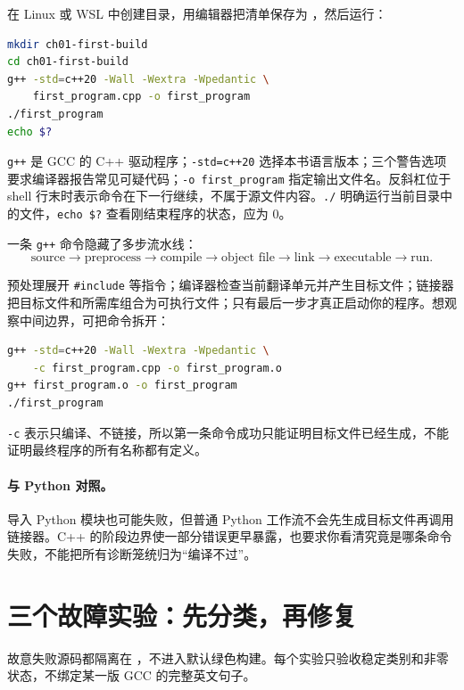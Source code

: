 在 Linux 或 WSL 中创建目录，用编辑器把清单保存为 ，然后运行：

\begin{lstlisting}[language=bash,numbers=none]
mkdir ch01-first-build
cd ch01-first-build
g++ -std=c++20 -Wall -Wextra -Wpedantic \
    first_program.cpp -o first_program
./first_program
echo $?
\end{lstlisting}

\texttt{g++} 是 GCC 的 C++ 驱动程序；\texttt{-std=c++20} 选择本书语言版本；三个警告选项要求编译器报告常见可疑代码；\texttt{-o first\_program} 指定输出文件名。反斜杠位于 shell 行末时表示命令在下一行继续，不属于源文件内容。\texttt{./} 明确运行当前目录中的文件，\texttt{echo \$?} 查看刚结束程序的状态，应为 0。

一条 \texttt{g++} 命令隐藏了多步流水线：
\[
\text{source} \longrightarrow \text{preprocess} \longrightarrow
\text{compile} \longrightarrow \text{object file} \longrightarrow
\text{link} \longrightarrow \text{executable} \longrightarrow \text{run}.
\]

预处理展开 \texttt{\#include} 等指令；编译器检查当前翻译单元并产生目标文件；链接器把目标文件和所需库组合为可执行文件；只有最后一步才真正启动你的程序。想观察中间边界，可把命令拆开：

\begin{lstlisting}[language=bash,numbers=none]
g++ -std=c++20 -Wall -Wextra -Wpedantic \
    -c first_program.cpp -o first_program.o
g++ first_program.o -o first_program
./first_program
\end{lstlisting}

\texttt{-c} 表示只编译、不链接，所以第一条命令成功只能证明目标文件已经生成，不能证明最终程序的所有名称都有定义。

\paragraph{与 Python 对照。}
导入 Python 模块也可能失败，但普通 Python 工作流不会先生成目标文件再调用链接器。C++ 的阶段边界使一部分错误更早暴露，也要求你看清究竟是哪条命令失败，不能把所有诊断笼统归为“编译不过”。

\section{三个故障实验：先分类，再修复}

故意失败源码都隔离在 ，不进入默认绿色构建。每个实验只验收稳定类别和非零状态，不绑定某一版 GCC 的完整英文句子。

